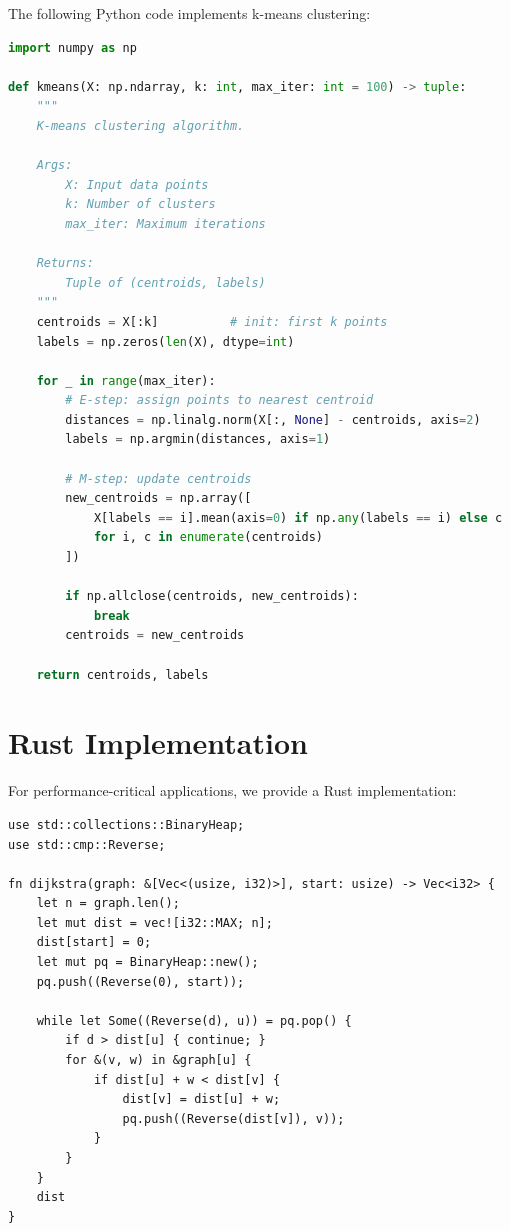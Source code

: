 \documentclass{article}
\begin{document}
The following Python code implements k-means clustering:

\begin{lstlisting}[language=Python, caption={K-means clustering implementation}]
import numpy as np

def kmeans(X: np.ndarray, k: int, max_iter: int = 100) -> tuple:
    """
    K-means clustering algorithm.
    
    Args:
        X: Input data points
        k: Number of clusters
        max_iter: Maximum iterations
    
    Returns:
        Tuple of (centroids, labels)
    """
    centroids = X[:k]          # init: first k points
    labels = np.zeros(len(X), dtype=int)

    for _ in range(max_iter):
        # E-step: assign points to nearest centroid
        distances = np.linalg.norm(X[:, None] - centroids, axis=2)
        labels = np.argmin(distances, axis=1)

        # M-step: update centroids
        new_centroids = np.array([
            X[labels == i].mean(axis=0) if np.any(labels == i) else c
            for i, c in enumerate(centroids)
        ])

        if np.allclose(centroids, new_centroids):
            break
        centroids = new_centroids

    return centroids, labels
\end{lstlisting}

\section{Rust Implementation}

For performance-critical applications, we provide a Rust implementation:

\begin{verbatim}
use std::collections::BinaryHeap;
use std::cmp::Reverse;

fn dijkstra(graph: &[Vec<(usize, i32)>], start: usize) -> Vec<i32> {
    let n = graph.len();
    let mut dist = vec![i32::MAX; n];
    dist[start] = 0;
    let mut pq = BinaryHeap::new();
    pq.push((Reverse(0), start));

    while let Some((Reverse(d), u)) = pq.pop() {
        if d > dist[u] { continue; }
        for &(v, w) in &graph[u] {
            if dist[u] + w < dist[v] {
                dist[v] = dist[u] + w;
                pq.push((Reverse(dist[v]), v));
            }
        }
    }
    dist
}
\end{verbatim}
\end{document}
